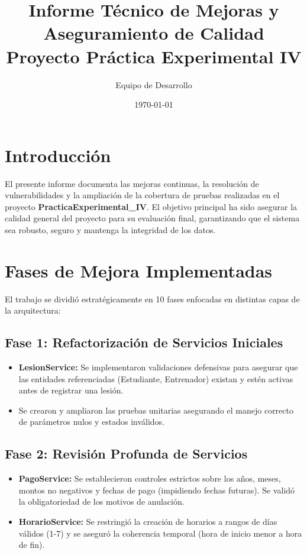\documentclass[12pt,a4paper]{article}
\title{Informe Técnico de Mejoras y Aseguramiento de Calidad \\ Proyecto Práctica Experimental IV}
\author{Equipo de Desarrollo}
\date{\today}
\begin{document}
\maketitle

\section{Introducción}
El presente informe documenta las mejoras continuas, la resolución de vulnerabilidades y la ampliación de la cobertura de pruebas realizadas en el proyecto \textbf{PracticaExperimental\_IV}. El objetivo principal ha sido asegurar la calidad general del proyecto para su evaluación final, garantizando que el sistema sea robusto, seguro y mantenga la integridad de los datos.

\section{Fases de Mejora Implementadas}

El trabajo se dividió estratégicamente en 10 fases enfocadas en distintas capas de la arquitectura:

\subsection{Fase 1: Refactorización de Servicios Iniciales}
\begin{itemize}
    \item \textbf{LesionService:} Se implementaron validaciones defensivas para asegurar que las entidades referenciadas (Estudiante, Entrenador) existan y estén activas antes de registrar una lesión.
    \item Se crearon y ampliaron las pruebas unitarias asegurando el manejo correcto de parámetros nulos y estados inválidos.
\end{itemize}

\subsection{Fase 2: Revisión Profunda de Servicios}
\begin{itemize}
    \item \textbf{PagoService:} Se establecieron controles estrictos sobre los años, meses, montos no negativos y fechas de pago (impidiendo fechas futuras). Se validó la obligatoriedad de los motivos de anulación.
    \item \textbf{HorarioService:} Se restringió la creación de horarios a rangos de días válidos (1-7) y se aseguró la coherencia temporal (hora de inicio menor a hora de fin).
\end{itemize}
\end{document}
